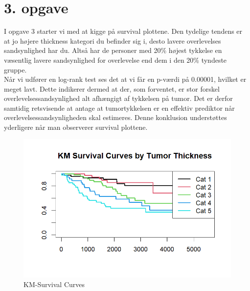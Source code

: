 \chapter{3. opgave}
I opgave 3 starter vi med at kigge på survival plottene. Den tydelige tendens er at jo højere thickness kategori du befinder sig i, desto lavere overlevelses sandsynlighed har du. Altså har de personer med 20\% højest tykkelse en væsentlig lavere sandsynlighed for overlevelse end dem i den 20\% tyndeste gruppe.\\
Når vi udfører en log-rank test ses det at vi får en p-værdi på 0.00001, hvilket er meget lavt. Dette indikerer dermed at der, som forventet, er stor forskel overlevelsessandsynlighed alt afhængigt af tykkelsen på tumor. Det er derfor samtidig retsvisende at antage at tumortykkelsen er en effektiv prediktor når overlevelsessandsynligheden skal estimeres. Denne konklusion understøttes yderligere når man observerer survival plottene.
\begin{figure}[H]
    \centering
    \includegraphics[width=1\linewidth]{Formalities/Billeder/surv_curves_project.png}
    \caption{KM-Survival Curves}
    \label{surv_curv}
\end{figure}


